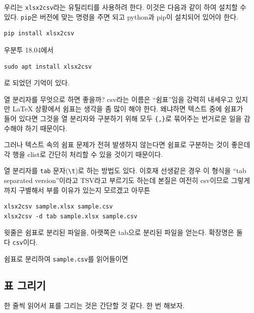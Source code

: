 우리는 \verb|xlsx2csv|라는 유틸리티를 사용하려 한다. 이것은 다음과 같이 하여
설치할 수 있다. \verb|pip|은 버전에 맞는 명령을 주면 되고 python과 pip이
설치되어 있어야 한다.
\begin{verbatim}
pip install xlsx2csv
\end{verbatim}
우분투 18.04에서 
\begin{verbatim}
sudo apt install xlsx2csv
\end{verbatim}
로 되었던 기억이 있다.

열 분리자를 무엇으로 하면 좋을까? csv라는 이름은 “쉼표”임을 강력히 내세우고 있지만
\LaTeX{} 상황에서 쉼표는 생각을 좀 많이 해야 한다. 왜냐하면 텍스트 중에 쉼표가 
들어 있다면 그것을 열 분리자와 구분하기 위해 모두 \verb|{,}|로 묶어주는 번거로운
일을 감수해야 하기 때문이다.

그러나 텍스트 속의 쉼표 문제가 전혀 발생하지 않는다면 쉼표로 구분하는 것이 좋은데
각 행을 clist로 간단히 처리할 수 있을 것이기 때문이다.

열 분리자를 \verb|tab| 문자(\verb|\t|)로 하는 방법도 있다. 이호재 선생같은 경우
이 형식을 “tab separated version”이라고 TSV라고 부르기도 하는데 본질은 여전히 csv이므로
그렇게까지 구별해서 부를 이유가 있는지 모르겠고 아무튼 

\begin{verbatim}
xlsx2csv sample.xlsx sample.csv
xlsx2csv -d tab sample.xlsx sample.csv
\end{verbatim}

윗줄은 쉼표로 분리된 파일을, 아랫쪽은 tab으로 분리된 파일을 얻는다. 확장명은 둘 다
\verb|csv|이다.

쉼표로 분리하여 \verb|sample.csv|를 읽어들이면

\begin{examplebelow}

\end{examplebelow}

\subsection{표 그리기}

한 줄씩 읽어서 표를 그리는 것은 간단할 것 같다. 한 번 해보자.


